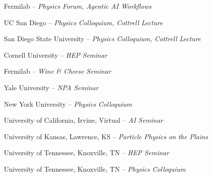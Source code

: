 \documentclass[11pt,letterpaper]{article}
\begin{document}
  \begin{itemizetighter}



    \item Fermilab -- \emph{Physics Forum, Agentic AI Workflows}  %

    \item UC San Diego -- \emph{Physics Colloquium, Cottrell Lecture}  %

    \item San Diego State University -- \emph{Physics Colloquium, Cottrell Lecture}  %

    \item Cornell University -- \emph{HEP Seminar}  %

    \item Fermilab -- \emph{Wine \& Cheese Seminar}  %

    \item Yale University -- \emph{NPA Seminar}  %

    \item New York University -- \emph{Physics Colloquium}  %

    \item University of California, Irvine, Virtual -- \emph{AI Seminar} 

    \item University of Kansas, Lawrence, KS -- \emph{Particle Physics on the Plains} 

    \item University of Tennessee, Knoxville, TN -- \emph{HEP Seminar} %

    \item University of Tennessee, Knoxville, TN -- \emph{Physics Colloquium} %


\end{itemizetighter}
\end{document}
